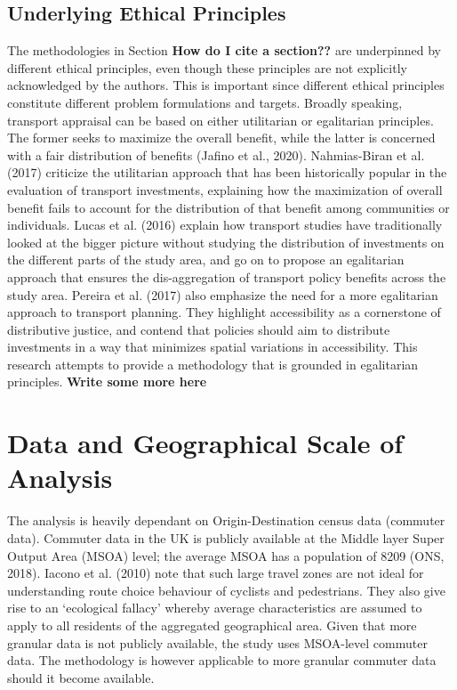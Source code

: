 \documentclass[
]{article}
\begin{document}
\hypertarget{underlying-ethical-principles}{%
\subsection{Underlying Ethical
Principles}\label{underlying-ethical-principles}}

The methodologies in Section \textbf{How do I cite a section??} are
underpinned by different ethical principles, even though these
principles are not explicitly acknowledged by the authors. This is
important since different ethical principles constitute different
problem formulations and targets. Broadly speaking, transport appraisal
can be based on either utilitarian or egalitarian principles. The former
seeks to maximize the overall benefit, while the latter is concerned
with a fair distribution of benefits (Jafino et al., 2020).
Nahmias-Biran et al. (2017) criticize the utilitarian approach that has
been historically popular in the evaluation of transport investments,
explaining how the maximization of overall benefit fails to account for
the distribution of that benefit among communities or individuals. Lucas
et al. (2016) explain how transport studies have traditionally looked at
the bigger picture without studying the distribution of investments on
the different parts of the study area, and go on to propose an
egalitarian approach that ensures the dis-aggregation of transport
policy benefits across the study area. Pereira et al. (2017) also
emphasize the need for a more egalitarian approach to transport
planning. They highlight accessibility as a cornerstone of distributive
justice, and contend that policies should aim to distribute investments
in a way that minimizes spatial variations in accessibility. This
research attempts to provide a methodology that is grounded in
egalitarian principles. \textbf{Write some more here}

\hypertarget{data-and-geographical-scale-of-analysis}{%
\section{Data and Geographical Scale of
Analysis}\label{data-and-geographical-scale-of-analysis}}

The analysis is heavily dependant on Origin-Destination census data
(commuter data). Commuter data in the UK is publicly available at the
Middle layer Super Output Area (MSOA) level; the average MSOA has a
population of 8209 (ONS, 2018). Iacono et al. (2010) note that such
large travel zones are not ideal for understanding route choice
behaviour of cyclists and pedestrians. They also give rise to an
`ecological fallacy' whereby average characteristics are assumed to
apply to all residents of the aggregated geographical area. Given that
more granular data is not publicly available, the study uses MSOA-level
commuter data. The methodology is however applicable to more granular
commuter data should it become available.
\end{document}

